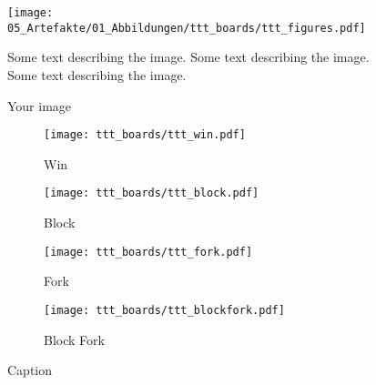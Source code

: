 



\begin{figure}
   \begin{minipage}[c]{.5\textwidth}
   \centering
    \texttt{[image: 05\_Artefakte/01\_Abbildungen/ttt\_boards/ttt\_figures.pdf]}
   \end{minipage}%
   \begin{minipage}[c]{.5\textwidth}
      Some text describing the image.
      Some text describing the image.
      Some text describing the image.
   \end{minipage}
   \caption{Your image}
\end{figure}

\begin{figure}
    \centering
    \begin{subfigure}[b]{0.45\textwidth}
      \centering
      \texttt{[image: ttt\_boards/ttt\_win.pdf]}
      \caption{Win}
      \label{fig:ttt_win}
    \end{subfigure}
    \begin{subfigure}[b]{0.45\textwidth}
      \centering
      \texttt{[image: ttt\_boards/ttt\_block.pdf]}
      \caption{Block}
      \label{fig:ttt_block}
    \end{subfigure}
    \begin{subfigure}[b]{0.45\textwidth}
      \centering
      \texttt{[image: ttt\_boards/ttt\_fork.pdf]}
      \caption{Fork}
      \label{fig:ttt_fork}
    \end{subfigure}
    \begin{subfigure}[b]{0.45\textwidth}
      \centering
      \texttt{[image: ttt\_boards/ttt\_blockfork.pdf]}
      \caption{Block Fork}
      \label{fig:ttt_blockfork}
    \end{subfigure}
    \caption{Caption}
    \label{fig:ttt_expertplay}
    
\end{figure}

